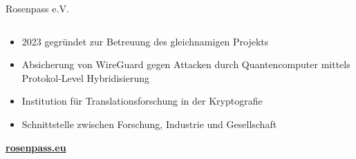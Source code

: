 \begin{frame}{Rosenpass e.V.}
  \begin{columns}[fullwidth,c]

    \begin{column}{.7\linewidth}
      \begin{itemize}
        \item 2023 gegründet zur Betreuung des gleichnamigen Projekts
        \vfill
        \item Absicherung von WireGuard gegen Attacken durch Quantencomputer mittels Protokol-Level Hybridisierung
        \item Institution für Translationsforschung in der Kryptografie
        \vfill
        \item Schnittstelle zwischen Forschung, Industrie und Gesellschaft
      \end{itemize}
      \bigskip
      \textbf{\url{rosenpass.eu}}
    \end{column}%
  \end{columns}
\end{frame}
